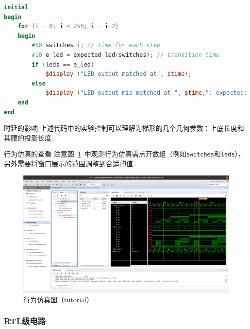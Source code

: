 \documentclass[fontset=windows,11pt]{SEU-Digital-Report}
\begin{document}
                \begin{lstlisting}[language=verilog,title=tutorial\_tb.v]
initial
begin
    for (i = 0; i < 255; i = i+2)
    begin
        #50 switches=i; // time for each step
        #10 e_led = expected_led(switches); // transition time
        if (leds == e_led)
            $display ("LED output matched at", $time);
        else
            $display ("LED output mis-matched at ", $time,": expected: %b, actual: %b", e_led, leds);
    end
end
                \end{lstlisting}

                \begin{analyze}{时延的影响}{}
                    上述代码中的实验控制可以理解为梯形的几个几何参数：上底长度和其腰的投影长度.
                \end{analyze}

                \begin{note}{行为仿真的查看}{}
                    注意图~\ref{fig:behavioral_simulation}~中观测行为仿真需点开数组（例如\texttt{switches}和\texttt{leds}），
                    另外需要将窗口展示的范围调整到合适的值.
                \end{note}

                \begin{figure}[htbp]
                    \includegraphics[width=\linewidth]{fig/behavioral_simulation_EXP1.png}
                    \caption{行为仿真图（tutorial）}
                    \label{fig:behavioral_simulation}
                \end{figure}

            \subsubsection{RTL级电路}
\end{document}
